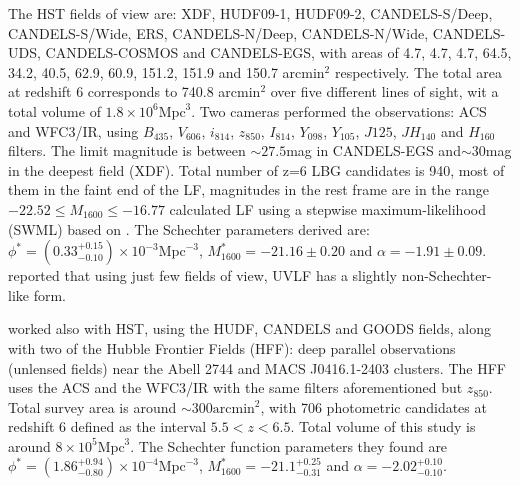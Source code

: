 \documentclass{emulateapj}
\begin{document}
The HST fields of view are: XDF, HUDF09-1, HUDF09-2, CANDELS-S/Deep, 
CANDELS-S/Wide, ERS, CANDELS-N/Deep, CANDELS-N/Wide, CANDELS-UDS, 
CANDELS-COSMOS and CANDELS-EGS, with areas of 4.7, 4.7, 4.7, 64.5, 34.2, 
40.5, 62.9, 60.9, 151.2, 151.9 and 150.7 arcmin$^2$ respectively. The total area 
at redshift 6 corresponds 
to 740.8 arcmin$^2$ over five different lines of sight, wit a total volume of 
$1.8 \times 10^6 \textrm{Mpc}^3$.
Two cameras performed the observations: ACS and WFC3/IR, using 
$B_{435}$, $V_{606}$, $ i_{814}$, $ z_{850}$, $ I_{814}$, $Y_{098}$, $Y_{105}$, $J{125}$, 
$JH_{140}$ and $H_{160}$ filters.
The limit magnitude is between $\sim27.5$mag in CANDELS-EGS and$\sim30 $mag in the 
deepest field (XDF). Total number of z=6 LBG candidates is 940, most of them in the faint 
end of the LF, magnitudes in the rest frame are in the range $-22.52\leq M_{1600} \leq -16.77$
\citet{Bouwens15} calculated LF using a stepwise maximum-likelihood (SWML) based on \citet{Efstathiou88}. 
The Schechter parameters derived are: 
$\phi^* =(0.33_{-0.10}^{+0.15}) \times 10 ^{-3}  \textrm{Mpc}^{-3} $, 
$M^*_{1600} = -21.16\pm 0.20$ and $\alpha = -1.91 \pm 0.09$. 
\citet{Bouwens15} reported that using just few fields of view, UVLF has a slightly non-Schechter-like form. 

\citet{Finkelstein14} worked also with HST, using the HUDF, CANDELS and GOODS fields, 
along with two of the Hubble Frontier Fields (HFF): deep parallel observations (unlensed 
fields) near the Abell 2744 and MACS J0416.1-2403 clusters. The HFF uses the ACS and 
the WFC3/IR with the same filters aforementioned but $z_{850}$. Total survey area is around 
$\sim300\textrm{arcmin}^2$, with 706 photometric candidates at redshift 6 defined as the interval $5.5<z<6.5$. 
Total volume of this study is around $ 8 \times 10^5 \textrm{Mpc}^3$. The Schechter function parameters they found are $\phi^* =(1.86_{-0.80}^{+0.94}) \times 10 ^{-4}  \textrm{Mpc}^{-3} $, 
$M^*_{1600} = -21.1_{-0.31}^{+0.25}$ and $\alpha = -2.02_{-0.10}^{+0.10}$. 
\end{document}
